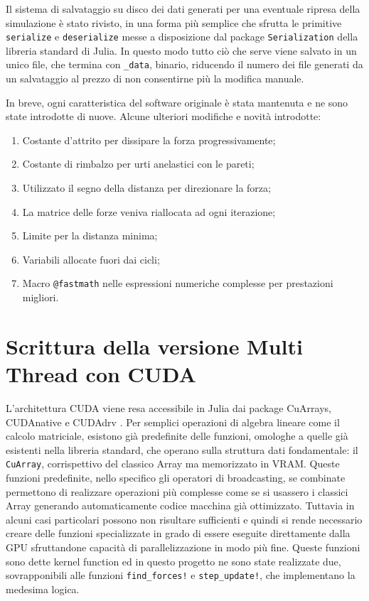 \documentclass[11pt, a4paper]{article}
\begin{document}
Il sistema di salvataggio su disco dei dati generati per una eventuale ripresa della simulazione è stato rivisto, in una forma più semplice che sfrutta le primitive \texttt{serialize} e \texttt{deserialize} messe a disposizione dal package \texttt{Serialization} della libreria standard di Julia. In questo modo tutto ciò che serve viene salvato in un unico file, che termina con \texttt{\_data}, binario, riducendo il numero dei file generati da un salvataggio al prezzo di non consentirne più la modifica manuale. 

In breve, ogni caratteristica del software originale è stata mantenuta e ne sono state introdotte di nuove.
Alcune ulteriori modifiche e novità introdotte:

\begin{enumerate}
    \item Costante d'attrito per dissipare la forza progressivamente;
    \item Costante di rimbalzo per urti anelastici con le pareti;
    \item Utilizzato il segno della distanza per direzionare la forza;
    \item La matrice delle forze veniva riallocata ad ogni iterazione;
    \item Limite per la distanza minima;
    \item Variabili allocate fuori dai cicli;
    \item Macro \texttt{@fastmath} nelle espressioni numeriche complesse per prestazioni migliori.
\end{enumerate}

\section{Scrittura della versione Multi Thread con CUDA}
L'architettura CUDA viene resa accessibile in Julia dai package CuArrays, CUDAnative e CUDAdrv \cite{CUDAJL}. Per semplici operazioni di algebra lineare come il calcolo matriciale, esistono già predefinite delle funzioni, omologhe a quelle già esistenti nella libreria standard, che operano sulla struttura dati fondamentale: il \texttt{CuArray}, corrispettivo del classico Array ma memorizzato in VRAM. Queste funzioni predefinite, nello specifico gli operatori di broadcasting, se combinate permettono di realizzare operazioni più complesse come se si usassero i classici Array generando automaticamente codice macchina già ottimizzato. Tuttavia in alcuni casi particolari possono non risultare sufficienti e quindi si rende necessario creare delle funzioni specializzate in grado di essere eseguite direttamente dalla GPU sfruttandone capacità di parallelizzazione in modo più fine. Queste funzioni sono dette kernel function ed in questo progetto ne sono state realizzate due, sovrapponibili alle funzioni \texttt{find\_forces!} e \texttt{step\_update!}, che implementano la medesima logica.
\end{document}
